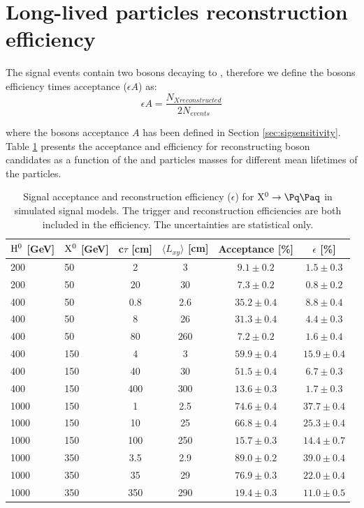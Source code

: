 
\section{Long-lived particles reconstruction efficiency}
\label{sec:signalefficiency}

The signal events contain two \X bosons decaying to \qq, therefore we define the \X bosons 
 efficiency times acceptance ($\epsilon A$) as:
\begin{equation}
\epsilon A= \frac{N_{X reconstructed}}{2N_{events}}
\end{equation}

where the \X bosons acceptance $A$ has been defined in Section \ref{sec:sigsensitivity}. 
Table \ref{tab:sigeff} presents the acceptance and efficiency for
reconstructing \X boson candidates as a function of the \Higgs and \X particles masses for different 
mean lifetimes of the \X particles.

\begin{table}[htbp]
\caption{
Signal acceptance and reconstruction efficiency ($\epsilon$) for $\X \to \qq$ in simulated signal models.
The trigger and reconstruction efficiencies are both included in the efficiency.
The uncertainties are statistical only.\label{tab:sigeff}}
\centering
\begin{tabular}{llcccc}
\hline
$\mathrm{H}^{0}$ [GeV] & $\mathrm{X^{0}}$ [GeV] & c$\tau$ [cm] & $\langle L_{xy} \rangle$ [cm] & Acceptance [\%] & $\epsilon$ [\%] \\
\hline
200 & 50 & 2 & 3 & $9.1\pm0.2$ & $1.5\pm0.3$ \\
200 & 50 & 20 & 30 & $7.3\pm0.2$ & $0.8\pm0.2$ \\
\hline
400 & 50 & 0.8 & 2.6 & $35.2\pm0.4$ & $8.8\pm0.4$ \\
400 & 50 & 8 & 26 & $31.3\pm0.4$ & $4.4\pm0.3$ \\
400 & 50 & 80 & 260 & $7.2\pm0.2$ & $1.6\pm0.4$ \\
\hline
400 & 150 & 4 & 3 & $59.9\pm0.4$ & $15.9\pm0.4$ \\
400 & 150 & 40 & 30 & $51.5\pm0.4$ & $6.7\pm0.3$ \\
400 & 150 & 400 & 300 & $13.6\pm0.3$ & $1.7\pm0.3$ \\
\hline 
1000 & 150 & 1 & 2.5 & $74.6\pm0.4$ & $37.7\pm0.4$ \\
1000 & 150 & 10 & 25 & $66.8\pm0.4$ & $25.3\pm0.4$ \\ 
1000 & 150 & 100 & 250 & $15.7\pm0.3$ & $14.4\pm0.7$ \\
\hline 
1000 & 350 & 3.5 & 2.9 & $89.0\pm0.2$ & $39.0\pm0.4$ \\
1000 & 350 & 35 & 29 & $76.9\pm0.3$ & $22.0\pm0.4$ \\
1000 & 350 & 350 & 290 & $19.4\pm0.3$ & $11.0\pm0.5$ \\
\hline
\end{tabular}
\end{table}

